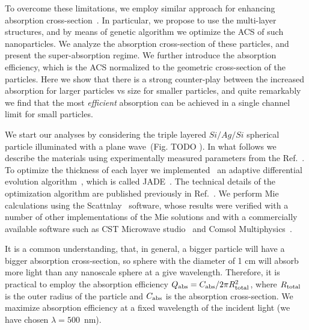 \documentclass[aps,prl,twocolumn,showpacs,superscriptaddress,groupedaddress]{revtex4-1}
\begin{document}
To overcome these limitations, we employ similar approach for
enhancing absorption cross-section~\cite{Fan-2011}. In particular, we
propose to use the multi-layer structures, and by means of genetic
algorithm we optimize the ACS of such nanoparticles. We analyze the
absorption cross-section of these particles, and present the
super-absorption regime. We further introduce the absorption
efficiency, which is the ACS normalized to the geometric cross-section
of the particles. Here we show that there is a strong counter-play
between the increased absorption for larger particles vs size for
smaller particles, and quite remarkably we find that the most {\em
  efficient} absorption can be achieved in a single channel limit for
small particles.

We start our analyses by considering the triple layered $Si/Ag/Si$
spherical particle illuminated with a plane wave~(Fig. TODO ). In what
follows we describe the materials using experimentally measured
parameters from the Ref.~\cite{palik-1997}.  To optimize the thickness
of each layer we implemented~\cite{JADE-web} an adaptive differential
evolution algorithm~\cite{Storn-DE-first-1997}, which is called
JADE~\cite{Jingqiao-JADE-2009}.  The technical details of the
optimization algorithm are published previously in
Ref.~\cite{Ladutenko-2014}. We perform Mie calculations using the
Scattnlay~\cite{Pena-scattnlay-2009,Scattnlay-web} software, whose
results were verified with a number of other implementations of the
Mie solutions and with a commercially available software such as CST
Microwave studio~\cite{CST-web} and Comsol
Multiphysics~\cite{Comsol-web}.

It is a common understanding, that, in general, a bigger particle will
have a bigger absorption cross-section, so sphere with the diameter of
1 cm will absorb more light than any nanoscale sphere at a give
wavelength. Therefore, it is practical to employ the absorption
efficiency $Q_{\rm abs}=C_{\rm abs}/2\pi R_{\rm total}^2$, where
$R_{\rm total}$ is the outer radius of the particle and $C_{\rm abs}$
is the absorption cross-section. We maximize absorption efficiency at
a fixed wavelength of the incident light (we have chosen
$\lambda=500$~nm).
\end{document}
